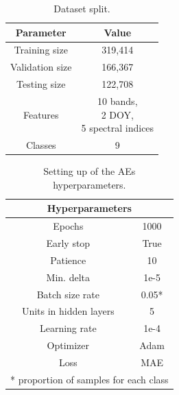 \documentclass[journal,article,submit,pdftex,moreauthors]{Definitions/mdpi}
\begin{document}
\begin{minipage}[t]{0.5\textwidth}
	\begin{table}[H]
		\caption{Dataset split.}
		\begin{tabular}{c|c} 
			\hline
			Parameter & Value \\ [1ex] 
			\hline
			Training size & 319,414 \\ [1ex]
			Validation size & 166,367 \\[1ex]
			Testing size & 122,708 \\ [1ex]
			Features & \makecell{10 bands, \\ 2 DOY,\\ 5 spectral indices} \\ [1ex] 
			Classes & 9 \\ [1ex] 
			\hline
		\end{tabular}
	\label{data_split}
	\end{table}
\end{minipage}
\begin{minipage}[t]{0.35\textwidth}
	\begin{table}[H]
		\caption{Setting up of the AEs hyperparameters.}
		\begin{tabular}{c|c}
		\hline
			\multicolumn{2}{c}{Hyperparameters} \\ \hline
			Epochs & 1000 \\
			Early stop & True \\ 
			Patience & 10 \\ 
			Min. delta & 1e-5 \\ 
			Batch size rate & 0.05* \\ 
			Units in hidden layers & 5 \\ 
			Learning rate & 1e-4 \\ 
			Optimizer & Adam \\ 
			Loss & MAE \\ \hline
			\multicolumn{2}{c}{* proportion of samples for each class}
		\end{tabular}
		\label{hyperparameters_aes}
	\end{table}
\end{minipage}
\end{document}

